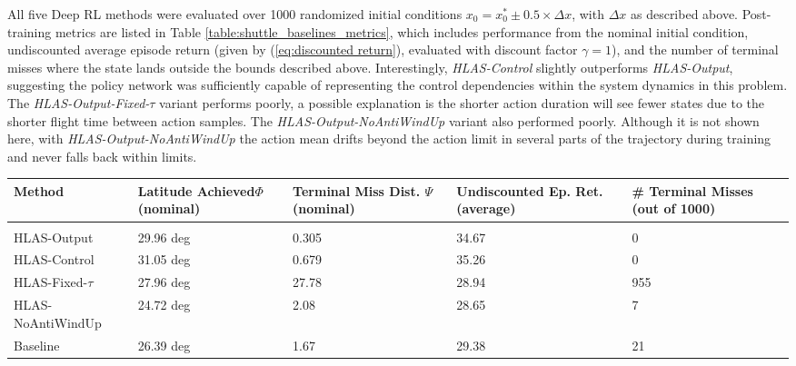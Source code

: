 \documentclass{UnderReview}
\begin{document}
All five Deep RL methods were evaluated over 1000 randomized initial conditions  $x_0=x_0^* \pm 0.5\times\Delta x$, with $\Delta x$ as described above.  Post-training metrics are listed in Table \ref{table:shuttle_baselines_metrics}, which includes performance from the nominal initial condition, undiscounted average episode return (given by (\ref{eq:discounted return}), evaluated with discount factor $\gamma=1$), and the number of terminal misses where the state lands outside the bounds described above.  Interestingly, \textit{HLAS-Control} slightly outperforms \textit{HLAS-Output}, suggesting the policy network was sufficiently capable of representing the control dependencies within the system dynamics in this problem.  The \textit{HLAS-Output-Fixed-$\tau$} variant performs poorly, a possible explanation is the shorter action duration will see fewer states due to the shorter flight time between action samples.  The \textit{HLAS-Output-NoAntiWindUp} variant also performed poorly. Although it is not shown here, with \textit{HLAS-Output-NoAntiWindUp} the action mean drifts beyond the action limit in several parts of the trajectory during training and never falls back within limits.
\begin{table*}[ht]
	\renewcommand{\arraystretch}{1.2}
	\caption{Post training metrics.  Averages were taken over 1000 initial condition perturbations.} \label{table:shuttle_baselines_metrics}
	\centering %
	\begin{tabular}{lp{25mm}p{27mm}p{25mm}p{25mm}}
		\hline {Method} & Latitude Achieved\newline $\Phi$ (nominal) & Terminal Miss Dist. \newline $\Psi$ (nominal) &  Undiscounted \newline Ep. Ret. (average) & \# Terminal Misses \newline (out of 1000) \\
		\hline\vspace{-4mm} & & & & \\
		HLAS-Output & 29.96 deg & 0.305 & 34.67 & 0 \\ 		
		HLAS-Control & 31.05 deg & 0.679 & 35.26 & 0 \\ 
		HLAS-Fixed-$\tau$ & 27.96 deg & 27.78 & 28.94 & 955 \\ 
		HLAS-NoAntiWindUp & 24.72 deg & 2.08 & 28.65 & 7\\ 		
		Baseline & 26.39 deg & 1.67 & 29.38 & 21\\ 
		\hline		
	\end{tabular} 	
\end{table*}
\end{document}
